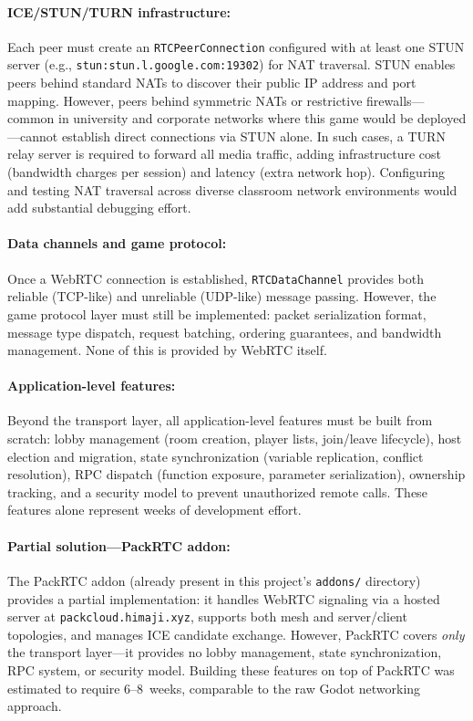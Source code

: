 \paragraph*{ICE/STUN/TURN infrastructure:}
Each peer must create an \texttt{RTCPeerConnection} configured with at least one STUN server (e.g., \texttt{stun:stun.l.google.com:19302}) for NAT traversal. STUN enables peers behind standard NATs to discover their public IP address and port mapping. However, peers behind symmetric NATs or restrictive firewalls---common in university and corporate networks where this game would be deployed---cannot establish direct connections via STUN alone. In such cases, a TURN relay server is required to forward all media traffic, adding infrastructure cost (bandwidth charges per session) and latency (extra network hop). Configuring and testing NAT traversal across diverse classroom network environments would add substantial debugging effort.

\paragraph*{Data channels and game protocol:}
Once a WebRTC connection is established, \texttt{RTCDataChannel} provides both reliable (TCP-like) and unreliable (UDP-like) message passing. However, the game protocol layer must still be implemented: packet serialization format, message type dispatch, request batching, ordering guarantees, and bandwidth management. None of this is provided by WebRTC itself.

\paragraph*{Application-level features:}
Beyond the transport layer, all application-level features must be built from scratch: lobby management (room creation, player lists, join/leave lifecycle), host election and migration, state synchronization (variable replication, conflict resolution), RPC dispatch (function exposure, parameter serialization), ownership tracking, and a security model to prevent unauthorized remote calls. These features alone represent weeks of development effort.

\paragraph*{Partial solution---PackRTC addon:}
The PackRTC addon \citep{packrtc_addon} (already present in this project's \texttt{addons/} directory) provides a partial implementation: it handles WebRTC signaling via a hosted server at \texttt{packcloud.himaji.xyz}, supports both mesh and server/client topologies, and manages ICE candidate exchange. However, PackRTC covers \textit{only} the transport layer---it provides no lobby management, state synchronization, RPC system, or security model. Building these features on top of PackRTC was estimated to require 6--8~weeks, comparable to the raw Godot networking approach.

